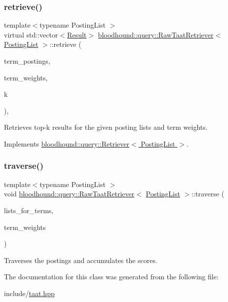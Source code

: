 \subsubsection{\texorpdfstring{retrieve()}{retrieve()}}
{\footnotesize\ttfamily template$<$typename Posting\+List $>$ \\
virtual std\+::vector$<$\hyperlink{structbloodhound_1_1query_1_1Result}{Result}$>$ \hyperlink{classbloodhound_1_1query_1_1RawTaatRetriever}{bloodhound\+::query\+::\+Raw\+Taat\+Retriever}$<$ \hyperlink{classbloodhound_1_1PostingList}{Posting\+List} $>$\+::retrieve (\begin{DoxyParamCaption}\item[{const std\+::vector$<$ \hyperlink{classbloodhound_1_1PostingList}{Posting\+List} $>$ \&}]{term\+\_\+postings,  }\item[{const std\+::vector$<$ \hyperlink{structbloodhound_1_1Score}{Score} $>$ \&}]{term\+\_\+weights,  }\item[{std\+::size\+\_\+t}]{k }\end{DoxyParamCaption})\hspace{0.3cm}{\ttfamily [inline]}, {\ttfamily [virtual]}}



Retrieves top-\/k results for the given posting lists and term weights. 



Implements \hyperlink{classbloodhound_1_1query_1_1Retriever_ae3c6a4628c5580e620c213b3dcd47c2b}{bloodhound\+::query\+::\+Retriever$<$ Posting\+List $>$}.

\mbox{\label{classbloodhound_1_1query_1_1RawTaatRetriever_a70007a6dd5213e9c28266e38b424ba20}} 
\subsubsection{\texorpdfstring{traverse()}{traverse()}}
{\footnotesize\ttfamily template$<$typename Posting\+List $>$ \\
void \hyperlink{classbloodhound_1_1query_1_1RawTaatRetriever}{bloodhound\+::query\+::\+Raw\+Taat\+Retriever}$<$ \hyperlink{classbloodhound_1_1PostingList}{Posting\+List} $>$\+::traverse (\begin{DoxyParamCaption}\item[{const std\+::vector$<$ \hyperlink{classbloodhound_1_1PostingList}{Posting\+List} $>$ \&}]{lists\+\_\+for\+\_\+terms,  }\item[{const std\+::vector$<$ \hyperlink{structbloodhound_1_1Score}{Score} $>$ \&}]{term\+\_\+weights }\end{DoxyParamCaption})\hspace{0.3cm}{\ttfamily [inline]}}



Traverses the postings and accumulates the scores. 



The documentation for this class was generated from the following file\+:\begin{DoxyCompactItemize}
\item 
include/\hyperlink{taat_8hpp}{taat.\+hpp}\end{DoxyCompactItemize}
